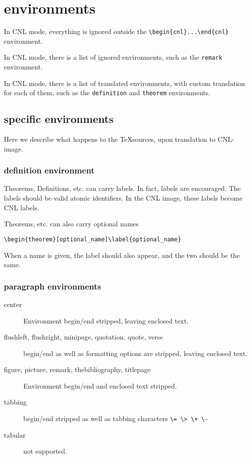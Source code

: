 \documentclass[12pt]{amsart}
\newtheorem{theorem}[definition]{Theorem}
\begin{document}
\section{environments}

In CNL mode, everything is ignored outside the
\verb!\begin{cnl}...\end{cnl}! environment.

In CNL mode, there is a list of ignored environments, such as the
\verb!remark! environment.

In CNL mode, there is a list of translated environments, with custom
translation for each of them, such as the \verb!definition!  and
\verb!theorem! environments.


\subsection{specific environments}

Here we describe what happens to the \TeX sources, 
upon translation to CNL-image.


\subsubsection{definition environment}

Theorems, Definitions, etc. can carry labels.  In fact, labels are
encouraged.  The labels should be valid atomic identifiers.  In the
CNL image, these labels become CNL labels.

Theorems, etc. can also carry optional names

\verb!\begin{theorem}[optional_name]\label{optional_name}!

When a name is given, the label should also appear, and the two should
be the same.


\subsubsection{paragraph environments}

\begin{description}
\item [center] Environment begin/end stripped, leaving enclosed text.
\item [flushleft, flushright, minipage, quotation, quote, verse]  begin/end as well as formatting options are stripped, leaving enclosed text.
\item [figure, picture, remark, thebibliography, titlepage] Environment begin/end and enclosed text stripped.
\item [tabbing]  begin/end stripped as well as tabbing characters \verb!\= \> \+ \-!
\item [tabular] not supported.
\end{description}
\end{document}
